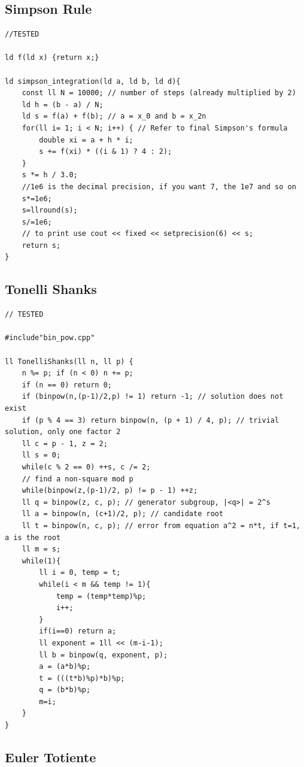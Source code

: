 \documentclass[10pt,a4paper,twocolumn]{article}
\begin{document}
	\subsection{Simpson Rule}
	
	\begin{lstlisting}[style=cpp, title={SimpsonRule.cpp}]
//TESTED

ld f(ld x) {return x;}

ld simpson_integration(ld a, ld b, ld d){
    const ll N = 10000; // number of steps (already multiplied by 2)
    ld h = (b - a) / N;
    ld s = f(a) + f(b); // a = x_0 and b = x_2n
    for(ll i= 1; i < N; i++) { // Refer to final Simpson's formula
        double xi = a + h * i;
        s += f(xi) * ((i & 1) ? 4 : 2);
    }
    s *= h / 3.0;
    //1e6 is the decimal precision, if you want 7, the 1e7 and so on
    s*=1e6;
    s=llround(s);
    s/=1e6;
    // to print use cout << fixed << setprecision(6) << s;
    return s;
}
	\end{lstlisting}

	\subsection{Tonelli Shanks}
	
	\begin{lstlisting}[style=cpp, title={TonelliShanks.cpp}]
// TESTED

#include"bin_pow.cpp"

ll TonelliShanks(ll n, ll p) {
    n %= p; if (n < 0) n += p;
    if (n == 0) return 0;
    if (binpow(n,(p-1)/2,p) != 1) return -1; // solution does not exist
    if (p % 4 == 3) return binpow(n, (p + 1) / 4, p); // trivial solution, only one factor 2
    ll c = p - 1, z = 2;
    ll s = 0;
    while(c % 2 == 0) ++s, c /= 2;
    // find a non-square mod p
    while(binpow(z,(p-1)/2, p) != p - 1) ++z;
    ll q = binpow(z, c, p); // generator subgroup, |<q>| = 2^s
    ll a = binpow(n, (c+1)/2, p); // candidate root
    ll t = binpow(n, c, p); // error from equation a^2 = n*t, if t=1, a is the root
    ll m = s;
    while(1){
        ll i = 0, temp = t;
        while(i < m && temp != 1){
            temp = (temp*temp)%p;
            i++;
        }
        if(i==0) return a;
        ll exponent = 1ll << (m-i-1);
        ll b = binpow(q, exponent, p);
        a = (a*b)%p;
        t = (((t*b)%p)*b)%p;
        q = (b*b)%p;
        m=i;
    }
}
	\end{lstlisting}

	\subsection{Euler Totiente}
	
\end{document}

